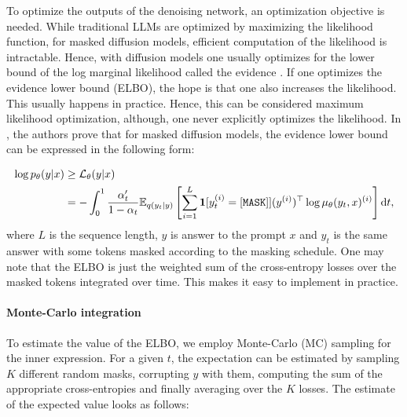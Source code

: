 To optimize the outputs of the denoising network, an optimization objective is needed. While traditional LLMs are optimized by maximizing the likelihood function, for masked diffusion models, efficient computation of the likelihood is intractable. Hence, with diffusion models one usually optimizes for the lower bound of the log marginal likelihood called the evidence \cite{shi2025simplifiedgeneralizedmaskeddiffusion, austin2021structureddenoisingdiffusionmodels, kingma2021variationaldiffusionmodels}. If one optimizes the evidence lower bound (ELBO), the hope is that one also increases the likelihood. This usually happens in practice. Hence, this can be considered maximum likelihood optimization, although, one never explicitly optimizes the likelihood. In \cite{shi2025simplifiedgeneralizedmaskeddiffusion}, the authors prove that for masked diffusion models, the evidence lower bound can be expressed in the following form:

\begin{align}
    \log p_\theta(y | x) & \ge \mathcal{L}_\theta(y | x) \nonumber                                                                                                                                                     \\
                         & = -\int_{0}^{1}\frac{\alpha_t'}{1 - \alpha_t}\mathbb{E}_{q(y_t | y)}\left[\sum_{i=1}^{L}\bold{1}[y_t^{(i)} = [\mathtt{MASK}]](y^{(i)})^\top\log\mu_\theta(y_t, x)^{(i)}\right] \mathrm{d}t,
    \label{eq:ELBO}
\end{align}
where $L$ is the sequence length, $y$ is answer to the prompt $x$ and $y_t$ is the same answer with some tokens masked according to the masking schedule. One may note that the ELBO is just the weighted sum of the cross-entropy losses over the masked tokens integrated over time. This makes it easy to implement in practice.

\paragraph{Monte-Carlo integration}

To estimate the value of the ELBO, we employ Monte-Carlo (MC) sampling \cite{methodsofnumericalintegration} for the inner expression. For a given $t$, the expectation can be estimated by sampling $K$ different random masks, corrupting $y$ with them, computing the sum of the appropriate cross-entropies and finally averaging over the $K$ losses. The estimate of the expected value looks as follows:

